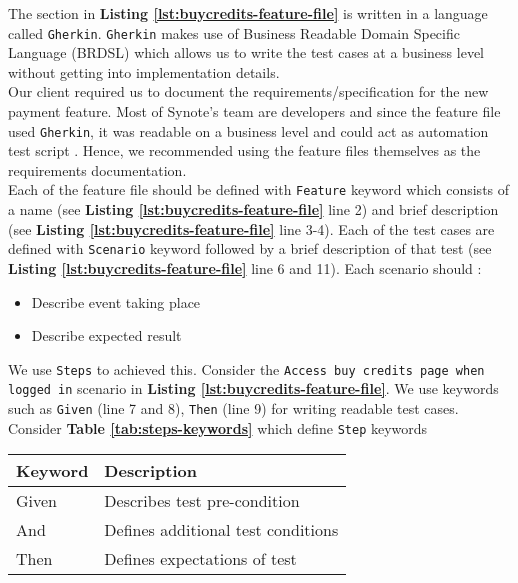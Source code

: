 The section in \textbf{Listing \ref{lst:buycredits-feature-file}} is written in a language called \texttt{Gherkin}. \texttt{Gherkin} makes use of Business Readable Domain Specific Language (BRDSL) which allows us to write the test cases at a business level without getting into implementation details.\\

Our client required us to document the requirements/specification for the new payment feature. Most of Synote's team are developers and since the feature file used \texttt{Gherkin}, it was readable on a business level and could act as automation test script \cite{featurefile1}. Hence, we recommended using the feature files themselves as the requirements documentation.\\

Each of the feature file should be defined with \texttt{Feature} keyword which consists of a name  (see \textbf{Listing \ref{lst:buycredits-feature-file}} line  2) and brief description  (see \textbf{Listing \ref{lst:buycredits-feature-file}} line  3-4). Each of the test cases are defined with \texttt{Scenario} keyword followed by a brief description of that test (see \textbf{Listing \ref{lst:buycredits-feature-file}} line  6 and 11). Each scenario should \cite{featurefile3}:
\begin{itemize}
\item Describe event taking place
\item Describe expected result
\end{itemize}

We use \texttt{Steps} to achieved this. Consider the \texttt{Access buy credits page when logged in} scenario in \textbf{Listing \ref{lst:buycredits-feature-file}}. We use keywords such as \texttt{Given} (line 7 and 8), \texttt{Then} (line 9) for writing readable test cases. Consider \textbf{Table \ref{tab:steps-keywords}} which define \texttt{Step} keywords \cite{featurefile1}

\begin{center}
\begin{tabular}{ |p{2cm}|p{7cm}| }

 \hline
 	Keyword &
 	Description\\
 \hline
 	Given & Describes test pre-condition\\
 \hline
 	And & Defines additional test conditions\\
 \hline
 	Then & Defines expectations of test \\
 \hline

\end{tabular}
\label{tab:steps-keywords}
\end{center}

